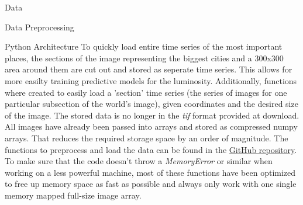 \documentclass[12pt,fleqn,leqno,letterpaper]{article}
\begin{document}
\begin{section}{Data}
\begin{subsection}{Data Preprocessing}
\begin{subsubsection}{Python Architecture}
      To quickly load entire time series of the most important places, the sections of the image representing the biggest cities and a 300x300 area around them are cut out and stored as seperate time series. This allows for more easilty training predictive models for the luminosity.
      Additionally, functions where created to easily load a 'section' time series (the series of images for one particular subsection of the world's image), given coordinates and the desired size of the image.
      The stored data is no longer in the \textit{tif} format provided at download. All images have already been passed into arrays and stored as compressed numpy arrays. That reduces the required storage space by an order of magnitude.
      The functions to preprocess and load the data can be found in the \hyperref[www.github.com/westermann/luminosity]{GitHub repository}. To make sure that the code doesn't throw a \textit{MemoryError} or similar when working on a less powerful machine, most of these functions have been optimized to free up memory space as fast as possible and always only work with one single memory mapped full-size image array.
    \end{subsubsection}
  \end{subsection}
\end{section}
\end{document}
